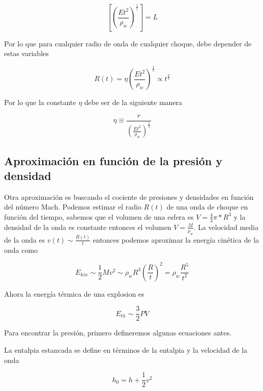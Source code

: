 \documentclass[12pt,a4paper]{book}
\begin{document}
\begin{equation}
  \left[ \left( \frac{Et^2}{ \rho_w } \right)^{\frac{1}{5}}\right] = L
\end{equation}

Por lo que para cualquier radio de onda de cualquier choque, debe depender de estas variables

\begin{equation}
  R(t) = \eta  \left( \frac{Et^2}{ \rho_w } \right)^{\frac{1}{5}} \varpropto t^{\frac{2}{5}}
\end{equation}

Por lo que la constante $\eta$ debe ser de la siguiente manera

\begin{equation}
  \eta \equiv \frac{r}{\left( \frac{Et^2}{\rho_w} \right)^{\frac{1}{5}}}
\end{equation}



\subsection{Aproximación en función de la presión y densidad}

Otra aproximación es buscando el cociente de presiones y densidades en función del número Mach.
Podemos estimar el radio $R(t)$ de una onda de choque en función del tiempo, sabemos que el volumen de una esfera es $V = \frac{4}{3} \pi * R^3$ y
la densidad de la onda es constante entonces el volumen $V = \frac{M}{\rho_w}$. La velocidad media de la onda es $v(t) \sim \frac{R(t)}{t} $
entonces podemos aproximar la energía cinética de la onda como 

\begin{equation}
	E_{kin} \sim \frac{1}{2} M v^2 \sim \rho_w R^3 \left( \frac{R}{t} \right) ^2 = \rho_w \frac{R^5}{t^2}
\end{equation}

Ahora la energía térmica de una explosion es 

\begin{equation} \label{eq_energia_termica}
	E_{th} \sim \frac{3}{2}PV
\end{equation}

Para encontrar la presión, primero defineremos algunas ecuaciones antes.

La entalpia estancada se define en términos de la entalpia y la velocidad de la onda 

\begin{equation}
	h_0 = h + \frac{1}{2} v^2
\end{equation}
\end{document}
